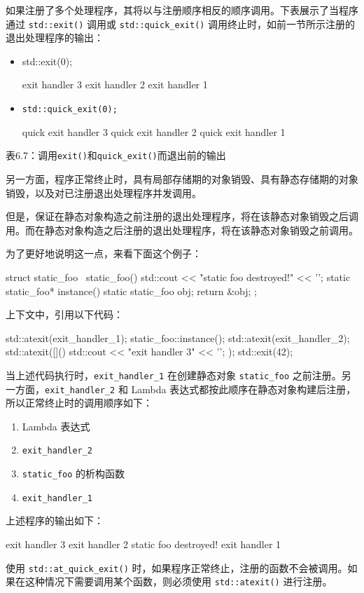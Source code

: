 如果注册了多个处理程序，其将以与注册顺序相反的顺序调用。下表展示了当程序通过 \verb|std::exit()| 调用或 \verb|std::quick_exit()| 调用终止时，如前一节所示注册的退出处理程序的输出：

\begin{itemize}
\item
std::exit(0);

\begin{shell}
exit handler 3
exit handler 2
exit handler 1
\end{shell}

\item
\verb|std::quick_exit(0);|

\begin{shell}
quick exit handler 3
quick exit handler 2
quick exit handler 1
\end{shell}
\end{itemize}

\begin{center}
表6.7：调用\verb|exit()|和\verb|quick_exit()|而退出前的输出
\end{center}

另一方面，程序正常终止时，具有局部存储期的对象销毁、具有静态存储期的对象销毁，以及对已注册退出处理程序并发调用。

但是，保证在静态对象构造之前注册的退出处理程序，将在该静态对象销毁之后调用。而在静态对象构造之后注册的退出处理程序，将在该静态对象销毁之前调用。

为了更好地说明这一点，来看下面这个例子：

\begin{cpp}
struct static_foo
{
    ~static_foo() { std::cout << "static foo destroyed!" << '\n'; }
    static static_foo* instance()
    {
        static static_foo obj;
        return &obj;
    }
};
\end{cpp}

上下文中，引用以下代码：

\begin{cpp}
std::atexit(exit_handler_1);
static_foo::instance();
std::atexit(exit_handler_2);
std::atexit([]() {std::cout << "exit handler 3" << '\n'; });
std::exit(42);
\end{cpp}

当上述代码执行时，\verb|exit_handler_1| 在创建静态对象 \verb|static_foo| 之前注册。另一方面，\verb|exit_handler_2| 和 Lambda 表达式都按此顺序在静态对象构建后注册，所以正常终止时的调用顺序如下：

\begin{enumerate}
\item
Lambda 表达式

\item
\verb|exit_handler_2|

\item
\verb|static_foo| 的析构函数

\item
\verb|exit_handler_1|
\end{enumerate}

上述程序的输出如下：

\begin{shell}
exit handler 3
exit handler 2
static foo destroyed!
exit handler 1
\end{shell}

使用 \verb|std::at_quick_exit()| 时，如果程序正常终止，注册的函数不会被调用。如果在这种情况下需要调用某个函数，则必须使用 \verb|std::atexit()| 进行注册。

